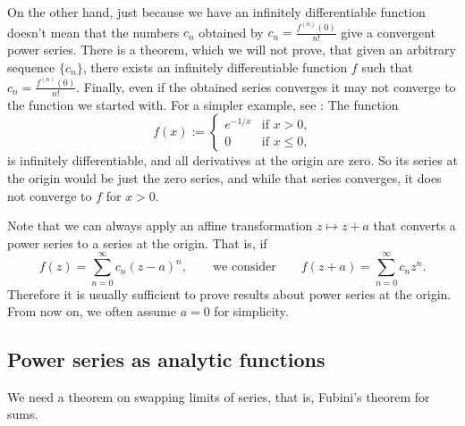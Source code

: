 
On the other hand, just because we have an infinitely differentiable
function doesn't mean that the numbers $c_n$ obtained by
$c_n = \frac{f^{(n)}(0)}{n!}$ give a convergent power series.
There is a theorem, which we will not prove,
that given an arbitrary sequence $\{ c_n \}$, there exists an
infinitely differentiable function $f$ such that
$c_n = \frac{f^{(n)}(0)}{n!}$.  Finally, even if the obtained series
converges it may not converge to the function we started with.
For a simpler example,
see :  The
function
\begin{equation*}
f(x) :=
\begin{cases}
e^{-1/x} & \text{if $x > 0$,}\\
0 & \text{if $x \leq 0$,}
\end{cases}
\end{equation*}
is infinitely differentiable, and all derivatives at the origin are zero.
So
its series at the origin would be just the zero series, and while that
series converges, it does not converge to $f$ for $x > 0$.

\medskip

Note that we can always apply an affine transformation $z \mapsto z+a$ that
converts a power series to a series at the origin.
That is, if
\begin{equation*}
f(z) = \sum_{n=0}^\infty c_n {(z-a)}^n,
\qquad \text{we consider} \qquad
f(z+a) = \sum_{n=0}^\infty c_n {z}^n.
\end{equation*}
Therefore it is usually
sufficient to prove results about power series at the origin.
From now on, we often assume $a=0$ for simplicity.

\subsection{Power series as analytic functions}

We need a theorem on swapping limits of series, that is, 
Fubini's theorem for sums.

